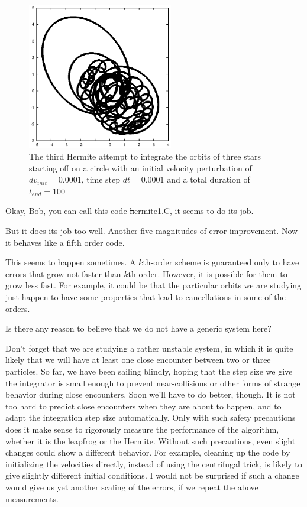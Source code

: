 \begin{figure}[htb]
\centering
\includegraphics[width=2.5in]{chap6/hermite1_0.0001_100.ps}
\caption[Three stars on a circle, Hermite, $dv_{init}=0.0001$, $dt = 0.0001$,
$t_{end} = 100$]
{The third Hermite attempt to integrate the orbits of three stars
starting off on a circle with an initial velocity perturbation of 
$dv_{init}=0.0001$, time step $dt = 0.0001$ and a total duration of
$t_{end} = 100$}
\label{fig:hermite1-0.0001-100}
\end{figure}

\abc

\carol
Okay, Bob, you can call this code {\st hermite1.C}, it seems to do its job.

\bob
But it does its job too well.  Another five magnitudes of error improvement.
Now it behaves like a fifth order code.

\alice
This seems to happen sometimes.  A $k$th-order scheme is guaranteed
only to have errors that grow not faster than $k$th order.  However,
it is possible for them to grow less fast.  For example, it could be
that the particular orbits we are studying just happen to have some
properties that lead to cancellations in some of the orders.

\carol
Is there any reason to believe that we do not have a generic system here?

\alice
Don't forget that we are studying a rather unstable system, in which
it is quite likely that we will have at least one close encounter
between two or three particles.  So far, we have been sailing blindly,
hoping that the step size we give the integrator is small enough to
prevent near-collisions or other forms of strange behavior during
close encounters.  Soon we'll have to do better, though.  It is not
too hard to predict close encounters when they are about to happen,
and to adapt the integration step size automatically.  Only with such
safety precautions does it make sense to rigorously measure the
performance of the algorithm, whether it is the leapfrog or the
Hermite.  Without such precautions, even slight changes could show a
different behavior.  For example, cleaning up the code by initializing
the velocities directly, instead of using the centrifugal trick, is
likely to give slightly different initial conditions.  I would not
be surprised if such a change would give us yet another scaling of the
errors, if we repeat the above measurements.

